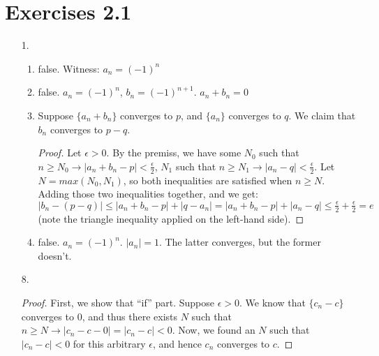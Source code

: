 \documentclass{article}
\begin{document}
\section*{Exercises 2.1}
\begin{itemize}
\item [1.]
  \begin{enumerate}[label=\alph*.]
  \item false. Witness: $a_n = (-1)^n$
  \item false. $a_n = (-1)^n$, $b_n = (-1)^{n+1}$. $a_n+b_n = 0$
  \item Suppose $\{a_n+b_n\}$ converges to $p$, and $\{a_n\}$
    converges to $q$. We claim that $b_n$ converges to $p-q$.
    \begin{proof}
      Let $\epsilon > 0$. By the premiss, we have some $N_0$ such that
      $n \geq N_0 \rightarrow |a_n+b_n - p| < \frac{\epsilon}{2}$,
      $N_1$ such that $n\geq N_1 \rightarrow |a_n-q| <
      \frac{\epsilon}{2}$.
      Let $N = max(N_0,N_1)$, so both inequalities are satisfied when
      $n \geq N$.
      Adding those two inequalities together, and we get:
      \( |b_n - (p-q)| \leq |a_n+b_n - p| + |q - a_n| = |a_n+b_n - p|
      + |a_n - q| \leq \frac{\epsilon}{2} + \frac{\epsilon}{2}  = e
      \) (note the triangle inequality applied on the left-hand side).
    \end{proof}
  \item false. $a_n = (-1)^n$. $|a_n| = 1$. The latter converges, but
    the former doesn't.
  \end{enumerate}
\item [8.]
  \begin{proof}
    First, we show that ``if'' part. Suppose $\epsilon>0$. We know
    that $\{c_n - c\}$ converges to $0$, and thus there exists $N$
    such that $n \geq N \rightarrow |c_n-c-0| = |c_n-c| < 0 $. Now, we
    found an $N$ such that $|c_n-c|<0$ for this arbitrary $\epsilon$,
    and hence $c_n$ converges to $c$.


\end{proof}
\end{itemize}
\end{document}
